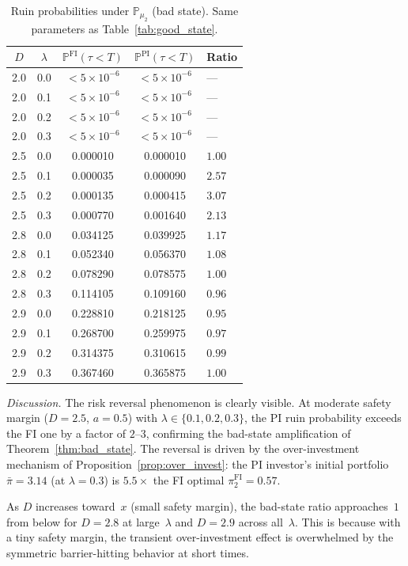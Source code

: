 \documentclass[12pt]{article}
\theoremstyle{remark}
\theoremstyle{definition}
\newcommand{\Prob}{\mathbb{P}}
\newcommand{\FI}{\mathrm{FI}}
\newcommand{\PI}{\mathrm{PI}}
\begin{document}
\begin{table}[H]
\centering
\caption{Ruin probabilities under $\Prob_{\mu_2}$ (bad state).
  Same parameters as Table~\ref{tab:good_state}.}
\label{tab:bad_state}
\smallskip
\begin{tabular}{ccccl}
\toprule
$D$ & $\lambda$ & $\Prob^{\FI}(\tau < T)$
    & $\Prob^{\PI}(\tau < T)$ & Ratio \\
\midrule
2.0 & 0.0 & ${<}5{\times}10^{-6}$ & ${<}5{\times}10^{-6}$ & --- \\
2.0 & 0.1 & ${<}5{\times}10^{-6}$ & ${<}5{\times}10^{-6}$ & --- \\
2.0 & 0.2 & ${<}5{\times}10^{-6}$ & ${<}5{\times}10^{-6}$ & --- \\
2.0 & 0.3 & ${<}5{\times}10^{-6}$ & ${<}5{\times}10^{-6}$ & --- \\
\midrule
2.5 & 0.0 & 0.000010 & 0.000010 & $1.00$ \\
2.5 & 0.1 & 0.000035 & 0.000090 & $2.57$ \\
2.5 & 0.2 & 0.000135 & 0.000415 & $3.07$ \\
2.5 & 0.3 & 0.000770 & 0.001640 & $2.13$ \\
\midrule
2.8 & 0.0 & 0.034125 & 0.039925 & $1.17$ \\
2.8 & 0.1 & 0.052340 & 0.056370 & $1.08$ \\
2.8 & 0.2 & 0.078290 & 0.078575 & $1.00$ \\
2.8 & 0.3 & 0.114105 & 0.109160 & $0.96$ \\
\midrule
2.9 & 0.0 & 0.228810 & 0.218125 & $0.95$ \\
2.9 & 0.1 & 0.268700 & 0.259975 & $0.97$ \\
2.9 & 0.2 & 0.314375 & 0.310615 & $0.99$ \\
2.9 & 0.3 & 0.367460 & 0.365875 & $1.00$ \\
\bottomrule
\end{tabular}
\end{table}

\emph{Discussion.}
The risk reversal phenomenon is clearly visible.
At moderate safety margin ($D = 2.5$, $a = 0.5$) with
$\lambda \in \{0.1, 0.2, 0.3\}$, the PI ruin probability exceeds the
FI one by a factor of $2$--$3$, confirming the bad-state amplification
of Theorem~\ref{thm:bad_state}.
The reversal is driven by the over-investment mechanism of
Proposition~\ref{prop:over_invest}: the PI investor's initial portfolio
$\bar{\pi} = 3.14$ (at $\lambda = 0.3$) is $5.5\times$ the FI optimal
$\pi_2^{\FI} = 0.57$.

As $D$ increases toward~$x$ (small safety margin), the bad-state
ratio approaches~$1$ from below for $D = 2.8$ at large~$\lambda$ and
$D = 2.9$ across all~$\lambda$.
This is because with a tiny safety margin, the transient
over-investment effect is overwhelmed by the symmetric
barrier-hitting behavior at short times.
\end{document}

